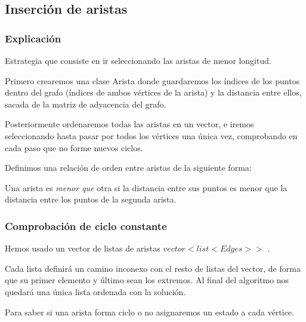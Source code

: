 \subsection{Inserción de aristas}
\subsubsection{Explicación}

\begin{frame}
	\begin{block}{  }
	Estrategia que consiste en ir seleccionando las aristas de menor longitud.
	
	Primero crearemos una clase Arista donde guardaremos los índices de los puntos dentro 
	del grafo (índices de ambos vértices de la arista) y la distancia entre ellos, sacada 
	de la matriz de adyacencia del grafo.
	
	Posteriormente ordenaremos todas las aristas en un vector, e iremos seleccionando 
	hasta pasar por todos los vértices una única vez, comprobando en cada paso que no 
	forme nuevos ciclos.
	\end{block}
	
	\begin{block}
	Definimos una relación de orden entre aristas de la siguiente forma:

	Una arista es \textit{menor que} otra si la distancia entre sus puntos es menor que la 
	distancia entre los puntos de la segunda arista.
	\end{block}
\end{frame}

\subsubsection{Comprobación de ciclo constante}
\begin{frame}
	\begin{block}{ }
	Hemos usado un vector de listas de aristas $vector < list <Edges> >$ .

	Cada lista definirá un camino inconexo con el resto de listas del vector, de forma que 
	su primer elemento y último sean los extremos.
	Al final del algoritmo nos quedará una única lista ordenada con la solución.
	\end{block}
		
	\begin{alertblock}{ }
	Para saber si una arista forma ciclo o no asignaremos un estado a cada vértice.
	\end{alertblock}
	
\end{frame}

